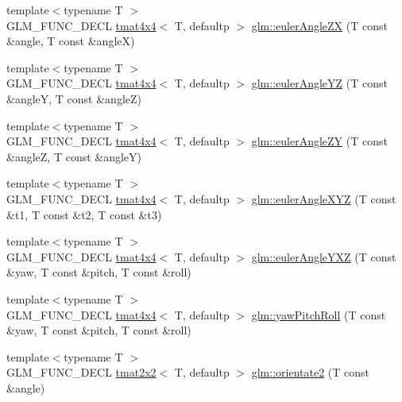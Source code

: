 \begin{DoxyCompactItemize}
\item 
{\footnotesize template$<$typename T $>$ }\\G\+L\+M\+\_\+\+F\+U\+N\+C\+\_\+\+D\+E\+CL \hyperlink{structglm_1_1tmat4x4}{tmat4x4}$<$ T, defaultp $>$ \hyperlink{group__gtx__euler__angles_gaef83cf40bd9ae780011b29970f16f622}{glm\+::euler\+Angle\+ZX} (T const \&angle, T const \&angleX)
\item 
{\footnotesize template$<$typename T $>$ }\\G\+L\+M\+\_\+\+F\+U\+N\+C\+\_\+\+D\+E\+CL \hyperlink{structglm_1_1tmat4x4}{tmat4x4}$<$ T, defaultp $>$ \hyperlink{group__gtx__euler__angles_ga1033f84f51d61646145352ef0c1bb58c}{glm\+::euler\+Angle\+YZ} (T const \&angleY, T const \&angleZ)
\item 
{\footnotesize template$<$typename T $>$ }\\G\+L\+M\+\_\+\+F\+U\+N\+C\+\_\+\+D\+E\+CL \hyperlink{structglm_1_1tmat4x4}{tmat4x4}$<$ T, defaultp $>$ \hyperlink{group__gtx__euler__angles_ga02f037926568bbd12dfece3b28b20343}{glm\+::euler\+Angle\+ZY} (T const \&angleZ, T const \&angleY)
\item 
{\footnotesize template$<$typename T $>$ }\\G\+L\+M\+\_\+\+F\+U\+N\+C\+\_\+\+D\+E\+CL \hyperlink{structglm_1_1tmat4x4}{tmat4x4}$<$ T, defaultp $>$ \hyperlink{group__gtx__euler__angles_gaaedda1657a1aebe0a904d864b33844e8}{glm\+::euler\+Angle\+X\+YZ} (T const \&t1, T const \&t2, T const \&t3)
\item 
{\footnotesize template$<$typename T $>$ }\\G\+L\+M\+\_\+\+F\+U\+N\+C\+\_\+\+D\+E\+CL \hyperlink{structglm_1_1tmat4x4}{tmat4x4}$<$ T, defaultp $>$ \hyperlink{group__gtx__euler__angles_ga0242b5ab68651db70c6025815549427f}{glm\+::euler\+Angle\+Y\+XZ} (T const \&yaw, T const \&pitch, T const \&roll)
\item 
{\footnotesize template$<$typename T $>$ }\\G\+L\+M\+\_\+\+F\+U\+N\+C\+\_\+\+D\+E\+CL \hyperlink{structglm_1_1tmat4x4}{tmat4x4}$<$ T, defaultp $>$ \hyperlink{group__gtx__euler__angles_gaf9c8d0f1df88c5344165600774489bc5}{glm\+::yaw\+Pitch\+Roll} (T const \&yaw, T const \&pitch, T const \&roll)
\item 
{\footnotesize template$<$typename T $>$ }\\G\+L\+M\+\_\+\+F\+U\+N\+C\+\_\+\+D\+E\+CL \hyperlink{structglm_1_1tmat2x2}{tmat2x2}$<$ T, defaultp $>$ \hyperlink{group__gtx__euler__angles_ga6f465681cbbc575ad93a53ec918dacf3}{glm\+::orientate2} (T const \&angle)
\item 

\end{DoxyCompactItemize}
